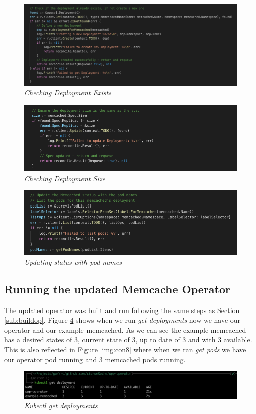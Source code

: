 \begin{figure}[!ht]
\centering
\includegraphics*[width=1\textwidth]{images/con4.png}
\caption{\em Checking Deployment Exists}
\label{img:con4}
\end{figure}

\begin{figure}[!ht]
\centering
\includegraphics*[width=1\textwidth]{images/con5.png}
\caption{\em Checking Deployment Size}
\label{img:con5}
\end{figure}

\begin{figure}[!ht]
\centering
\includegraphics*[width=1\textwidth]{images/con6.png}
\caption{\em Updating status with pod names}
\label{img:con6}
\end{figure}

\subsection{Running the updated Memcache Operator}
The updated operator was built and run following the same steps as Section \ref{sub:buildop}. Figure \ref{img:con7} shows when we run \textit{get deployments} now we have our operator and our example memcached. As we can see the example memcached has a desired states of 3, current state of 3, up to date of 3 and with 3 available. This is also reflected in Figure \ref{img:con8} where when we ran \textit{get pods} we have our operator pod running and 3 memcached pods running.
\begin{figure}[!ht]
\centering
\includegraphics*[width=1\textwidth]{images/con7.png}
\caption{\em Kubectl get deployments}
\label{img:con7}
\end{figure}

